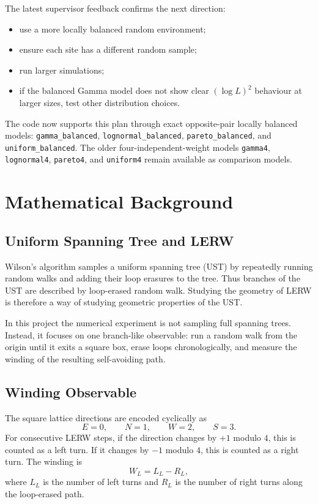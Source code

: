 \documentclass[11pt]{article}
\begin{document}
The latest supervisor feedback confirms the next direction:
\begin{itemize}
  \item use a more locally balanced random environment;
  \item ensure each site has a different random sample;
  \item run larger simulations;
  \item if the balanced Gamma model does not show clear $(\log L)^2$ behaviour
        at larger sizes, test other distribution choices.
\end{itemize}

The code now supports this plan through exact opposite-pair locally balanced
models: \texttt{gamma\_balanced}, \texttt{lognormal\_balanced},
\texttt{pareto\_balanced}, and \texttt{uniform\_balanced}. The older
four-independent-weight models \texttt{gamma4}, \texttt{lognormal4},
\texttt{pareto4}, and \texttt{uniform4} remain available as comparison models.

\section{Mathematical Background}

\subsection{Uniform Spanning Tree and LERW}

Wilson's algorithm samples a uniform spanning tree (UST) by repeatedly running
random walks and adding their loop erasures to the tree. Thus branches of the
UST are described by loop-erased random walk. Studying the geometry of LERW is
therefore a way of studying geometric properties of the UST.

In this project the numerical experiment is not sampling full spanning trees.
Instead, it focuses on one branch-like observable: run a random walk from the
origin until it exits a square box, erase loops chronologically, and measure
the winding of the resulting self-avoiding path.

\subsection{Winding Observable}

The square lattice directions are encoded cyclically as
\[
  E=0,\qquad N=1,\qquad W=2,\qquad S=3.
\]
For consecutive LERW steps, if the direction changes by $+1$ modulo $4$, this
is counted as a left turn. If it changes by $-1$ modulo $4$, this is counted as
a right turn. The winding is
\[
  W_L = L_L - R_L,
\]
where $L_L$ is the number of left turns and $R_L$ is the number of right turns
along the loop-erased path.
\end{document}
